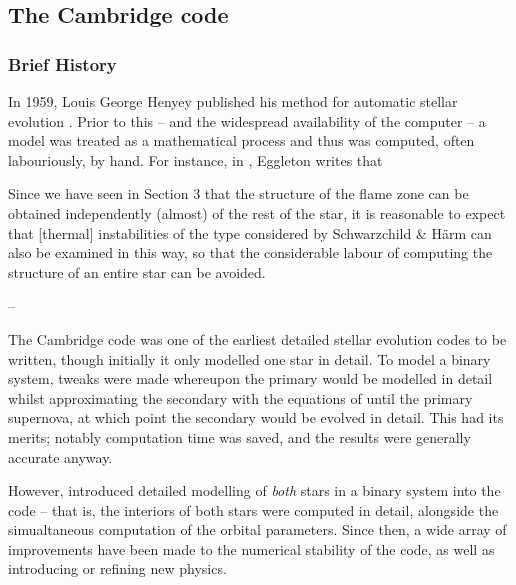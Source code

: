 \subsection{The Cambridge  code}\label{chap:numerical_methods_stars}

\subsubsection{Brief History}


In 1959, Louis George Henyey published his method for automatic stellar evolution \citep{Henyey:1959}. Prior to this -- and the widespread availability of the computer -- a model was treated as a mathematical process and thus was computed, often labouriously, by hand. For instance, in \citet{Eggleton:1967}, Eggleton writes that

\begin{fanciful}
    Since we have seen in Section 3 that the structure of the flame zone can be obtained independently (almost) of the rest of the star, it is reasonable to expect that [thermal] instabilities of the type considered by Schwarzchild \& H\"arm can also be examined in this way, so that the considerable labour of computing the structure of an entire star can be avoided.
    \begin{flushright}
        -- \citet{Eggleton:1967}
    \end{flushright}
\end{fanciful}

The Cambridge  code was one of the earliest detailed stellar evolution codes to be written, though initially it only modelled one star in detail. To model a binary system, tweaks were made whereupon the primary would be modelled in detail whilst approximating the secondary with the equations of \citet{Hurley:2002} until the primary supernova, at which point the secondary would be evolved in detail. This had its merits; notably computation time was saved, and the results were generally accurate anyway.

However, \citet{Stancliffe:2009} introduced detailed modelling of \textit{both} stars in a binary system into the  code -- that is, the interiors of both stars were computed in detail, alongside the simualtaneous computation of the orbital parameters. Since then, a wide array of improvements have been made to the numerical stability of the code, as well as introducing or refining new physics.

